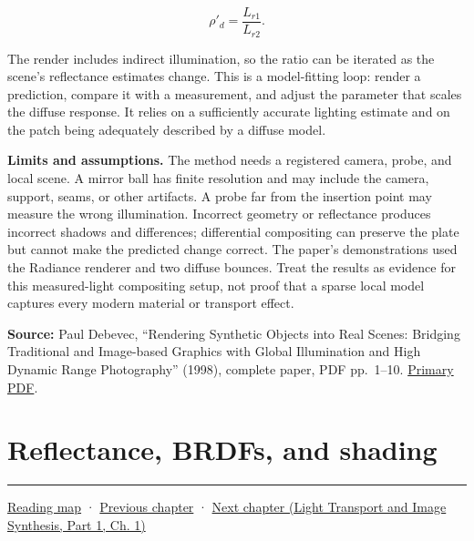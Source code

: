 \[\rho'_d=\frac{L_{r1}}{L_{r2}}.\]

The render includes indirect illumination, so the ratio can be iterated as the scene's reflectance estimates change. This is a model-fitting loop: render a prediction, compare it with a measurement, and adjust the parameter that scales the diffuse response. It relies on a sufficiently accurate lighting estimate and on the patch being adequately described by a diffuse model.

\textbf{Limits and assumptions.} The method needs a registered camera, probe, and local scene. A mirror ball has finite resolution and may include the camera, support, seams, or other artifacts. A probe far from the insertion point may measure the wrong illumination. Incorrect geometry or reflectance produces incorrect shadows and differences; differential compositing can preserve the plate but cannot make the predicted change correct. The paper's demonstrations used the Radiance renderer and two diffuse bounces. Treat the results as evidence for this measured-light compositing setup, not proof that a sparse local model captures every modern material or transport effect.

\textbf{Source:} Paul Debevec, ``Rendering Synthetic Objects into Real Scenes: Bridging Traditional and Image-based Graphics with Global Illumination and High Dynamic Range Photography'' (1998), complete paper, PDF pp.~1--10. \href{https://www.pauldebevec.com/Research/IBL/debevec-siggraph98.pdf}{Primary PDF}.

\section{Reflectance, BRDFs, and shading}\label{03-visual-computing-i-ch004-reflectance-brdfs-and-shading}

\hypertarget{03-visual-computing-i-ch004-reflectance-brdfs-and-shading}{}

\begin{center}\rule{0.5\linewidth}{0.5pt}\end{center}

\hyperref[volume-reading-map]{Reading map} · \hyperref[03-visual-computing-i-ch003-lens-optics-and-image-formation]{Previous chapter} · \href{../04-Light-Transport-and-Image-Synthesis-P01/main.pdf\#nameddest=03-visual-computing-i-ch005-reflectance-materials-and-light-transport}{Next chapter (Light Transport and Image Synthesis, Part 1, Ch. 1)}
